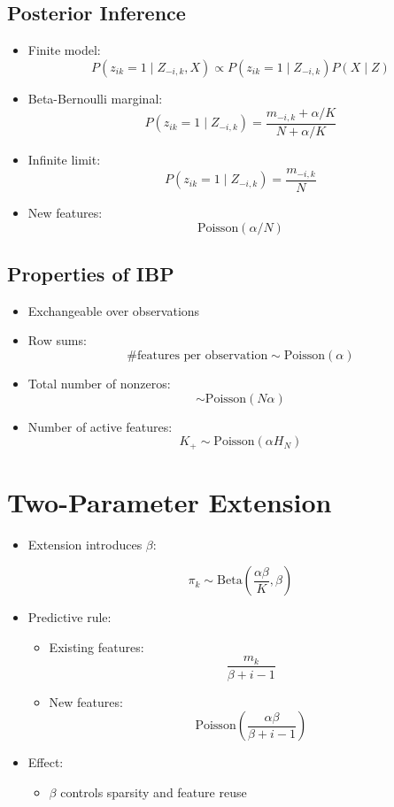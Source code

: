 \documentclass[12pt,oneside]{book}
\numberwithin{equation}{section}
\theoremstyle{definition}
\theoremstyle{plain}
\theoremstyle{remark}
\begin{document}
\subsection{Posterior Inference}

\begin{itemize}
\item Finite model:
\[
P(z_{ik}=1 \mid Z_{-i,k}, X)
\propto
P(z_{ik}=1 \mid Z_{-i,k}) P(X \mid Z)
\]

\item Beta-Bernoulli marginal:
\[
P(z_{ik}=1 \mid Z_{-i,k})
=
\frac{m_{-i,k} + \alpha/K}{N + \alpha/K}
\]

\item Infinite limit:
\[
P(z_{ik}=1 \mid Z_{-i,k})
=
\frac{m_{-i,k}}{N}
\]

\item New features:
\[
\text{Poisson}(\alpha/N)
\]
\end{itemize}

\subsection{Properties of IBP}

\begin{itemize}
\item Exchangeable over observations

\item Row sums:
\[
\# \text{features per observation} \sim \text{Poisson}(\alpha)
\]

\item Total number of nonzeros:
\[
\sim \text{Poisson}(N\alpha)
\]

\item Number of active features:
\[
K_+ \sim \text{Poisson}(\alpha H_N)
\]
\end{itemize}

\section{Two-Parameter Extension}

\begin{itemize}
\item Extension introduces $\beta$:

\[
\pi_k \sim \text{Beta}\left(\frac{\alpha \beta}{K}, \beta\right)
\]

\item Predictive rule:
\begin{itemize}
\item Existing features:
\[
\frac{m_k}{\beta + i - 1}
\]

\item New features:
\[
\text{Poisson}\left(\frac{\alpha \beta}{\beta + i - 1}\right)
\]
\end{itemize}

\item Effect:
\begin{itemize}
\item $\beta$ controls sparsity and feature reuse
\end{itemize}
\end{itemize}
\end{document}
